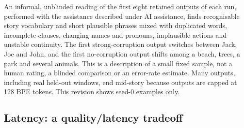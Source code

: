 \documentclass[
  british,
]{article}
\begin{document}
An informal, unblinded reading of the first eight retained outputs of
each run, performed with the assistance described under AI assistance,
finds recognisable story vocabulary and short plausible phrases mixed
with duplicated words, incomplete clauses, changing names and pronouns,
implausible actions and unstable continuity. The first strong-corruption
output switches between Jack, Joe and John, and the first no-corruption
output shifts among a beach, trees, a park and several animals. This is
a description of a small fixed sample, not a human rating, a blinded
comparison or an error-rate estimate. Many outputs, including real
held-out windows, end mid-story because outputs are capped at 128 BPE
tokens. This revision shows seed-0 examples only.

\subsection{Latency: a quality/latency
tradeoff}\label{latency-a-qualitylatency-tradeoff}
\end{document}
